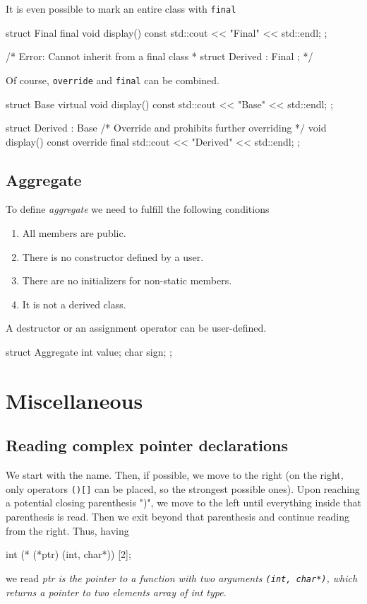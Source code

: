 \documentclass[../main]{subfiles}
\begin{document}
    It is even possible to mark an entire class with \texttt{final}
\begin{Code}
struct Final final
{
    void display() const
    {
        std::cout << "Final" << std::endl;
    }
};

/* Error: Cannot inherit from a final class
 * struct Derived : Final {};
 */
\end{Code}

    Of course, \texttt{override} and \texttt{final} can be combined.
\begin{Code}
struct Base
{
    virtual void display() const
    {
        std::cout << "Base" << std::endl;
    }
};

struct Derived : Base
{
    /* Override and prohibits further overriding */
    void display() const override final
    {
        std::cout << "Derived" << std::endl;
    }
};
\end{Code}

\subsection{Aggregate}
    To define \textit{aggregate} we need to fulfill the following conditions
\begin{enumerate}
    \item All members are public.
    \item There is no constructor defined by a user.
    \item There are no initializers for non-static members.
    \item It is not a derived class.
\end{enumerate}
\noindent
A destructor or an assignment operator can be user-defined.

\begin{Code}
    struct Aggregate
    {
        int value;
        char sign;
    };
\end{Code}

\section{Miscellaneous}
\subsection{Reading complex pointer declarations}
    We start with the name. Then, if possible, we move to the right (on the right, only operators \texttt{()[]} can be placed, so the strongest possible ones). Upon reaching a potential closing parenthesis ")",
we move to the left until everything inside that parenthesis is read. Then we exit beyond that parenthesis and continue reading from the right. Thus, having
\begin{Code}
    int (* (*ptr) (int, char*)) [2];
\end{Code}
we read \textit{ptr is the pointer to a function with two arguments \texttt{(int, char*)}, which returns a pointer to two elements array of int type}.
\end{document}
